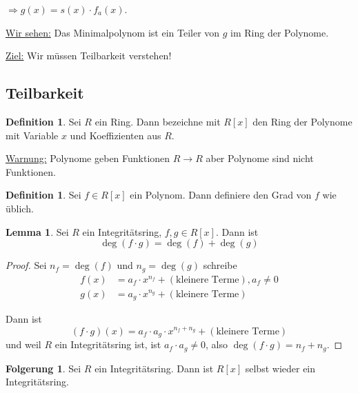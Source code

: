 \documentclass[12pt,parskip=full]{scrartcl}
\newcommand{\heading}{\underline}
\theoremstyle{definition}
\newtheorem{corollary}[theorem]{Folgerung}
\newtheorem{lemma}[theorem]{Lemma}
\newtheorem{definition}[theorem]{Definition}
\theoremstyle{remark}
\begin{document}
 	$\Rightarrow g(x) = s(x) \cdot f_a(x)$.
 	
 	\heading{Wir sehen:} Das Minimalpolynom ist ein Teiler von $g$ im Ring der Polynome.
 	
 	\heading{Ziel:} Wir müssen Teilbarkeit verstehen!
 	
 	\subsection{Teilbarkeit}
 	
 	\begin{definition}
 		Sei $R$ ein Ring. Dann bezeichne mit $R[x]$ den Ring der Polynome mit Variable $x$ und Koeffizienten aus $R$.
 	\end{definition}
 
 	\heading{Warnung:} Polynome geben Funktionen $R \to R$ aber Polynome sind nicht Funktionen.
 	
 	\begin{definition}
 		Sei $f \in R[x]$ ein Polynom. Dann definiere den Grad von $f$ wie üblich.
 	\end{definition}
 
 	\begin{lemma}
 		Sei $R$ ein Integritätsring, $f,g \in R[x]$. Dann ist
 		\begin{equation*}
	 		\deg(f \cdot g) = \deg(f) + \deg(g)
 		\end{equation*}
 	\end{lemma}
 
 	\begin{proof}
 		Sei $n_f = \deg(f)$ und $n_g = \deg(g)$ schreibe
 		\begin{align*}
	 		f(x) &= a_f \cdot x^{n_f} + (\text{kleinere Terme}), a_f \neq 0 \\
	 		g(x) &= a_g \cdot x^{n_g} + (\text{kleinere Terme})
 		\end{align*}
 		
 		Dann ist
 		\begin{equation*}
 			(f \cdot g)(x) = a_f \cdot a_g \cdot x^{n_f + n_g} + (\text{kleinere Terme})
 		\end{equation*}
 		und weil $R$ ein Integritätsring ist, ist $a_f \cdot a_g \neq 0$, also $\deg(f \cdot g) = n_f + n_g$.
 	\end{proof}
 
 	\begin{corollary}
 		Sei $R$ ein Integritätsring. Dann ist $R[x]$ selbst wieder ein Integritätsring.
 	\end{corollary}
 
\end{document}
